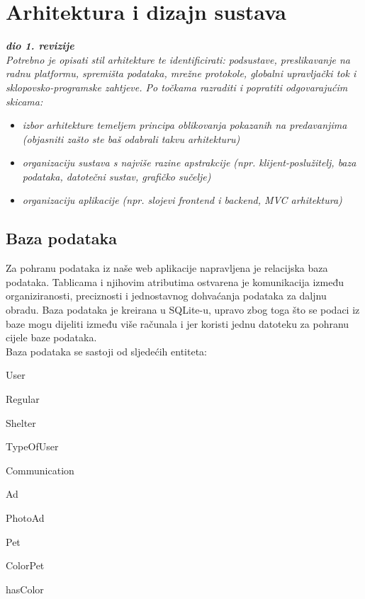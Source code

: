 \chapter{Arhitektura i dizajn sustava}
		
		\textbf{\textit{dio 1. revizije}}\\

		\textit{ Potrebno je opisati stil arhitekture te identificirati: podsustave, preslikavanje na radnu platformu, spremišta podataka, mrežne protokole, globalni upravljački tok i sklopovsko-programske zahtjeve. Po točkama razraditi i popratiti odgovarajućim skicama:}
	\begin{itemize}
		\item 	\textit{izbor arhitekture temeljem principa oblikovanja pokazanih na predavanjima (objasniti zašto ste baš odabrali takvu arhitekturu)}
		\item 	\textit{organizaciju sustava s najviše razine apstrakcije (npr. klijent-poslužitelj, baza podataka, datotečni sustav, grafičko sučelje)}
		\item 	\textit{organizaciju aplikacije (npr. slojevi frontend i backend, MVC arhitektura) }		
	\end{itemize}

	
		

		

				
		\section{Baza podataka}
			
			
		Za pohranu podataka iz naše web aplikacije napravljena je relacijska baza podataka. Tablicama i njihovim atributima ostvarena je komunikacija između organiziranosti, preciznosti i jednostavnog dohvaćanja podataka za daljnu obradu. Baza podataka je kreirana u SQLite-u, upravo zbog toga što se podaci iz baze mogu dijeliti između više računala i jer koristi jednu datoteku za pohranu cijele baze podataka.\\
		Baza podataka se sastoji od sljedećih entiteta:
		\begin{packed_item}
			\item User
			\item Regular
			\item Shelter
			\item TypeOfUser
			\item Communication
			\item Ad
			\item PhotoAd
			\item Pet
			\item ColorPet
			\item hasColor
		\end{packed_item}
		
